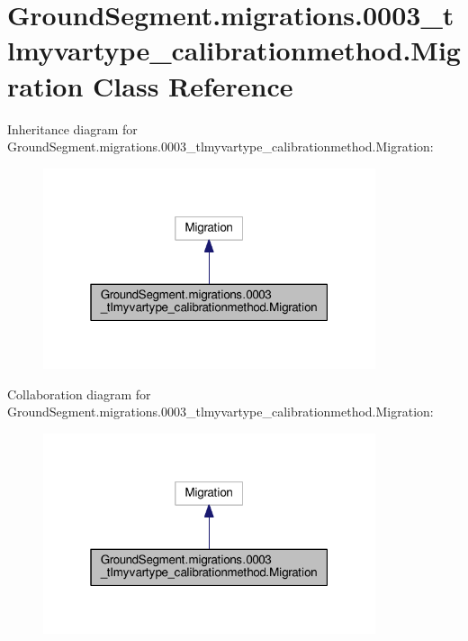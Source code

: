 \hypertarget{class_ground_segment_1_1migrations_1_10003__tlmyvartype__calibrationmethod_1_1_migration}{}\section{Ground\+Segment.\+migrations.0003\+\_\+tlmyvartype\+\_\+calibrationmethod.Migration Class Reference}
\label{class_ground_segment_1_1migrations_1_10003__tlmyvartype__calibrationmethod_1_1_migration}


Inheritance diagram for Ground\+Segment.\+migrations.0003\+\_\+tlmyvartype\+\_\+calibrationmethod.Migration\+:\nopagebreak
\begin{figure}[H]
\begin{center}
\leavevmode
\includegraphics[width=277pt]{class_ground_segment_1_1migrations_1_10003__tlmyvartype__calibrationmethod_1_1_migration__inherit__graph}
\end{center}
\end{figure}


Collaboration diagram for Ground\+Segment.\+migrations.0003\+\_\+tlmyvartype\+\_\+calibrationmethod.Migration\+:\nopagebreak
\begin{figure}[H]
\begin{center}
\leavevmode
\includegraphics[width=277pt]{class_ground_segment_1_1migrations_1_10003__tlmyvartype__calibrationmethod_1_1_migration__coll__graph}
\end{center}
\end{figure}
